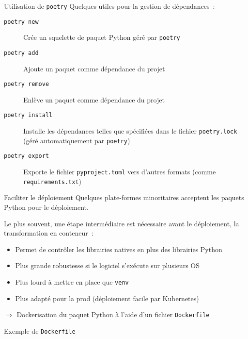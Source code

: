 \begin{frame}{Utilisation de \texttt{poetry}}
  Quelques  utiles pour la gestion de dépendances~:
  \begin{description}
    \item[\texttt{poetry new}] Crée un squelette de paquet Python géré par \texttt{poetry}
    \item[\texttt{poetry add}] Ajoute un paquet comme dépendance du projet
    \item[\texttt{poetry remove}] Enlève un paquet comme dépendance du projet
    \item[\texttt{poetry install}] Installe les dépendances telles que spécifiées dans le fichier \texttt{poetry.lock} (géré automatiquement par \texttt{poetry})
    \item[\texttt{poetry export}] Exporte le fichier \texttt{pyproject.toml} vers d'autres formats (comme \texttt{requirements.txt})
  \end{description}
\end{frame}

\begin{frame}{Faciliter le déploiement}
  Quelques plate-formes minoritaires acceptent les paquets Python pour le déploiement.

  Le plus souvent, une étape intermédiaire est nécessaire avant le déploiement, la transformation en conteneur~:

  \begin{itemize}
    \item Permet de contrôler les librairies natives en plus des librairies Python
    \item Plus grande robustesse si le logiciel s'exécute sur plusieurs OS
    \item Plus lourd à mettre en place que \texttt{venv}
    \item Plus adapté pour la prod (déploiement facile par Kubernetes)
  \end{itemize}

  $\Rightarrow$ Dockerisation du paquet Python à l'aide d'un fichier \texttt{Dockerfile}
\end{frame}

\begin{frame}{Exemple de \texttt{Dockerfile}}
\end{frame}
